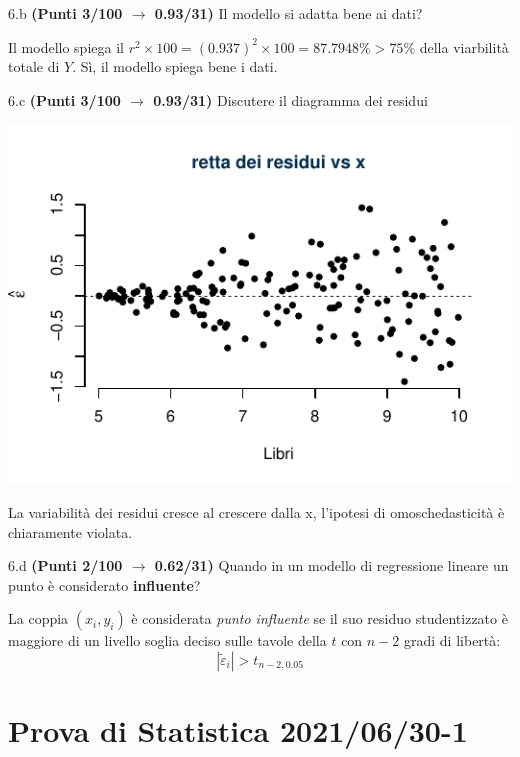 \documentclass[
  11pt,
]{book}
\theoremstyle{mytheoremstyle}
\theoremstyle{mydefstyle}
\newenvironment{sol}
  {
  \begin{tcolorbox}[enhanced,breakable,arc=0.1mm,boxrule=1pt,colback=white,colframe=iblue,
  title=\bf \fontfamily{lmss}\selectfont \hspace{.5 cm} Soluzione,drop fuzzy shadow]

}{
\end{tcolorbox}
  }
\begin{document}
6.b \textbf{(Punti 3/100 \(\rightarrow\) 0.93/31)} Il modello si adatta bene ai dati?

\begin{sol}
Il modello spiega il \(r^2\times100=(0.937)^2\times 100=87.7948\%>75\%\) della viarbilità totale di \(Y\). Sì, il modello spiega bene i dati.

\end{sol}

6.c \textbf{(Punti 3/100 \(\rightarrow\) 0.93/31)} Discutere il diagramma dei residui

\begin{center}\includegraphics{Esami_passati_con_soluzioni_files/figure-latex/2021-53-1} \end{center}

\begin{sol}
La variabilità dei residui cresce al crescere dalla x, l'ipotesi di omoschedasticità è chiaramente violata.

\end{sol}

6.d \textbf{(Punti 2/100 \(\rightarrow\) 0.62/31)} Quando in un modello di regressione lineare un punto è considerato \textbf{influente}?

\begin{sol}
La coppia \((x_i,y_i)\) è considerata \emph{punto influente} se il suo residuo studentizzato è maggiore di un livello soglia deciso sulle tavole della \(t\) con \(n-2\) gradi di libertà:
\[|\tilde \varepsilon_i|>t_{n-2,0.05} \]

\end{sol}

\section{Prova di Statistica 2021/06/30-1}\label{prova-di-statistica-20210630-1}
\end{document}
